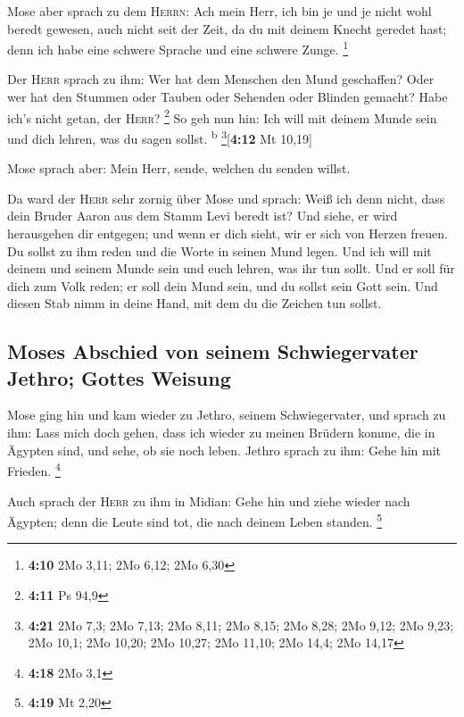  Mose aber sprach zu dem \textsc{Herrn}: Ach mein Herr,
ich bin je und je nicht wohl beredt gewesen, auch nicht seit der Zeit,
da du mit deinem Knecht geredet hast; denn ich habe eine schwere Sprache
und eine schwere Zunge. \footnote{\textbf{4:10} 2Mo 3,11; 2Mo 6,12; 2Mo
  6,30}

 Der \textsc{Herr} sprach zu ihm: Wer hat dem Menschen
den Mund geschaffen? Oder wer hat den Stummen oder Tauben oder Sehenden
oder Blinden gemacht? Habe ich's nicht getan, der \textsc{Herr}?
\footnote{\textbf{4:11} Ps 94,9}  So geh nun hin: Ich
will mit deinem Munde sein und dich lehren, was du sagen sollst.
\textsuperscript{b} \footnote{\textbf{4:21} 2Mo 7,3; 2Mo 7,13; 2Mo 8,11;
  2Mo 8,15; 2Mo 8,28; 2Mo 9,12; 2Mo 9,23; 2Mo 10,1; 2Mo 10,20; 2Mo
  10,27; 2Mo 11,10; 2Mo 14,4; 2Mo 14,17}{[}\textbf{4:12} Mt 10,19{]}

 Mose sprach aber: Mein Herr, sende, welchen du senden
willst.

 Da ward der \textsc{Herr} sehr zornig über Mose und
sprach: Weiß ich denn nicht, dass dein Bruder Aaron aus dem Stamm Levi
beredt ist? Und siehe, er wird herausgehen dir entgegen; und wenn er
dich sieht, wir er sich von Herzen freuen.  Du sollst zu
ihm reden und die Worte in seinen Mund legen. Und ich will mit deinem
und seinem Munde sein und euch lehren, was ihr tun sollt.
 Und er soll für dich zum Volk reden; er soll dein Mund
sein, und du sollst sein Gott sein.  Und diesen Stab nimm
in deine Hand, mit dem du die Zeichen tun sollst.

\hypertarget{moses-abschied-von-seinem-schwiegervater-jethro-gottes-weisung}{%
\subsection{Moses Abschied von seinem Schwiegervater Jethro; Gottes
Weisung}\label{moses-abschied-von-seinem-schwiegervater-jethro-gottes-weisung}}

 Mose ging hin und kam wieder zu Jethro, seinem
Schwiegervater, und sprach zu ihm: Lass mich doch gehen, dass ich wieder
zu meinen Brüdern komme, die in Ägypten sind, und sehe, ob sie noch
leben. Jethro sprach zu ihm: Gehe hin mit Frieden. \footnote{\textbf{4:18}
  2Mo 3,1}

 Auch sprach der \textsc{Herr} zu ihm in Midian: Gehe hin
und ziehe wieder nach Ägypten; denn die Leute sind tot, die nach deinem
Leben standen. \footnote{\textbf{4:19} Mt 2,20}

